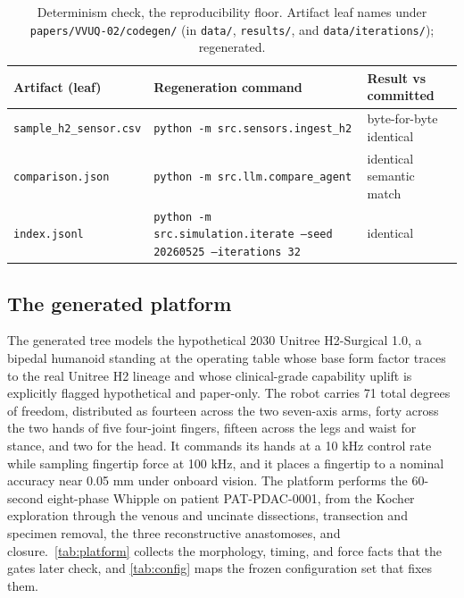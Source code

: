\begin{table}[H]
\caption{Determinism check, the reproducibility floor. Artifact leaf names under
\texttt{papers/VVUQ-02/codegen/} (in \texttt{data/}, \texttt{results/}, and
\texttt{data/iterations/}); regenerated.}
\label{tab:determinism}
\centering
\footnotesize
\begin{tabularx}{\textwidth}{L{4.3cm} Y L{3.4cm}}
\toprule
\textbf{Artifact (leaf)} & \textbf{Regeneration command} & \textbf{Result vs committed} \\
\midrule
\texttt{sample\_h2\_sensor.csv} & \texttt{python -m src.sensors.ingest\_h2} & byte-for-byte identical \\
\texttt{comparison.json} & \texttt{python -m src.llm.compare\_agent} & identical semantic match \\
\texttt{index.jsonl} & \texttt{python -m src.simulation.iterate --seed 20260525 --iterations 32} & identical \\
\bottomrule
\end{tabularx}
\end{table}

\subsection{The generated platform}

The generated tree models the hypothetical 2030 Unitree H2-Surgical 1.0, a
bipedal humanoid standing at the operating table whose base form factor traces to
the real Unitree H2 lineage and whose clinical-grade capability uplift is
explicitly flagged hypothetical and paper-only. The robot carries 71 total
degrees of freedom, distributed as fourteen across the two seven-axis arms, forty
across the two hands of five four-joint fingers, fifteen across the legs and
waist for stance, and two for the head. It commands its hands at a 10 kHz control
rate while sampling fingertip force at 100 kHz, and it places a fingertip to a
nominal accuracy near 0.05 mm under onboard vision. The platform performs the
60-second eight-phase Whipple on patient PAT-PDAC-0001, from the Kocher
exploration through the venous and uncinate dissections, transection and specimen
removal, the three reconstructive anastomoses, and closure.\ \autoref{tab:platform}
collects the morphology, timing, and force facts that the gates later check, and
\autoref{tab:config} maps the frozen configuration set that fixes them.

